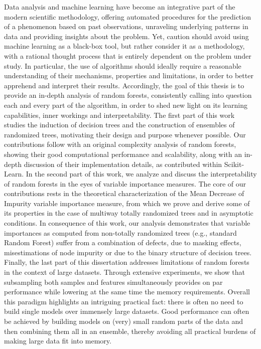 \clearpage
Data analysis and machine learning have become an integrative part
of the modern scientific methodology, offering automated procedures
for the prediction of a phenomenon based on past observations, unraveling underlying patterns in data and providing insights about
the problem. Yet, caution should avoid using machine learning as a
black-box tool, but rather consider it as a methodology, with a rational thought process that is entirely dependent on the problem under
study. In particular, the use of algorithms should ideally require a
reasonable understanding of their mechanisms, properties and limitations, in order to better apprehend and interpret their results.
Accordingly, the goal of this thesis is to provide an in-depth analysis of random forests, consistently calling into question each and
every part of the algorithm, in order to shed new light on its learning capabilities, inner workings and interpretability. The first part of
this work studies the induction of decision trees and the construction
of ensembles of randomized trees, motivating their design and purpose whenever possible. Our contributions follow with an original
complexity analysis of random forests, showing their good computational performance and scalability, along with an in-depth discussion
of their implementation details, as contributed within Scikit-Learn.
In the second part of this work, we analyze and discuss the interpretability of random forests in the eyes of variable importance
measures. The core of our contributions rests in the theoretical characterization of the Mean Decrease of Impurity variable importance
measure, from which we prove and derive some of its properties in
the case of multiway totally randomized trees and in asymptotic conditions. In consequence of this work, our analysis demonstrates that
variable importances as computed from non-totally randomized trees
(e.g., standard Random Forest) suffer from a combination of defects,
due to masking effects, misestimations of node impurity or due to
the binary structure of decision trees.
Finally, the last part of this dissertation addresses limitations of random forests in the context of large datasets. Through extensive experiments, we show that subsampling both samples and features simultaneously provides on par performance while lowering at the same
time the memory requirements. Overall this paradigm highlights an
intriguing practical fact: there is often no need to build single models over immensely large datasets. Good performance can often be
achieved by building models on (very) small random parts of the
data and then combining them all in an ensemble, thereby avoiding
all practical burdens of making large data fit into memory.
